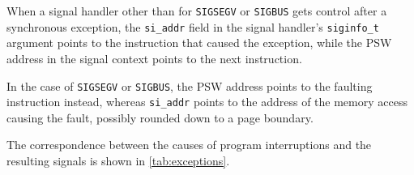 \documentclass[USenglish,fontsize=11pt,twoside,%
  toc=bib,toc=idx,toc=graduated,numbers=noendperiod,
  bookmarks=true,
  bookmarksnumbered=true,
  bookmarksopen=true,
  bookmarksopenlevel=1,
  breaklinks=true,
  colorlinks=true,
  linkcolor=black,
  pdfpagelayout={TwoPageRight},
  pdfusetitle=true
]{scrreprt}
\begin{document}
When a signal handler other than for \texttt{SIGSEGV} or \texttt{SIGBUS}
gets control after a synchronous exception, the \texttt{si\_addr} field in
the signal handler's \texttt{siginfo\_t} argument points to the
instruction that caused the exception, while the PSW address in the signal context points to the next instruction.

In the case of \texttt{SIGSEGV} or \texttt{SIGBUS}, the PSW address points
to the faulting instruction instead, whereas \texttt{si\_addr} points to
the address of the memory access causing the fault, possibly rounded down
to a page boundary.

The correspondence between the causes of program interruptions and the
resulting signals is shown in
\cref{tab:exceptions}.
\end{document}
